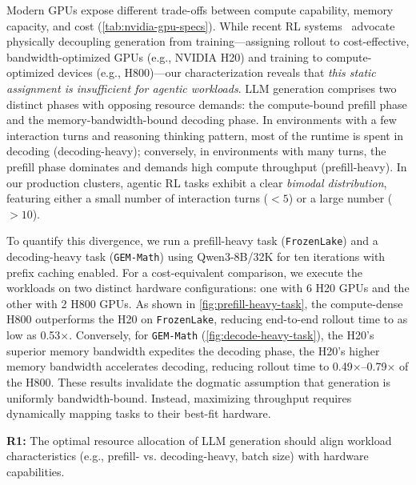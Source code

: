 Modern GPUs expose different trade-offs between compute capability, memory
capacity, and cost (\autoref{tab:nvidia-gpu-specs}). While recent RL
systems~\cite{StreamRL,asyncflow,seamlessflow} advocate physically decoupling
generation from training---assigning rollout to cost-effective,
bandwidth-optimized GPUs (e.g., NVIDIA H20) and training to
compute-optimized devices (e.g., H800)---our characterization reveals that \emph{this
static assignment is insufficient for agentic workloads}. LLM generation
comprises two distinct phases with opposing resource demands: the 
compute-bound prefill phase and the memory-bandwidth-bound decoding phase. In
environments with a few interaction turns and reasoning thinking pattern,
most of the runtime is spent in decoding (decoding-heavy); conversely, in
environments with many turns, the prefill phase dominates and demands high
compute throughput (prefill-heavy). In our production clusters,
agentic RL tasks exhibit a clear \emph{bimodal distribution}, featuring 
either a small number of interaction turns ($< 5$) or a large number ($> 10$).




To quantify this divergence, we run a prefill-heavy task (\texttt
{FrozenLake}) and a decoding-heavy task (\texttt{GEM-Math}) using
Qwen3-8B/32K for ten iterations with prefix caching enabled. For a
cost-equivalent comparison, we execute the workloads on two distinct hardware
configurations: one with 6 H20 GPUs and the other with 2 H800 GPUs. As shown
in \autoref{fig:prefill-heavy-task}, the compute-dense H800 outperforms the
H20 on \texttt{FrozenLake}, reducing end-to-end rollout time to as low as 0.53$\times$. Conversely, for \texttt{GEM-Math} (\autoref{fig:decode-heavy-task}), the
H20's superior memory bandwidth expedites the decoding phase, the H20's higher memory
bandwidth accelerates decoding, reducing rollout time to 0.49$\times$--0.79$\times$
of the H800. These
results invalidate the dogmatic assumption that generation is uniformly
bandwidth-bound. Instead, maximizing throughput requires 
dynamically mapping tasks to their best-fit hardware. 




\begin{tcolorbox}[colback=blue!5!white,colframe=gray!75!black,left=1mm, right=1mm, top=0.5mm, bottom=0.5mm, arc=1mm]
\noindent\textbf{R1:} The optimal resource allocation of LLM generation should align workload characteristics (e.g., prefill- vs. decoding-heavy, batch size) with hardware capabilities.
\end{tcolorbox}



